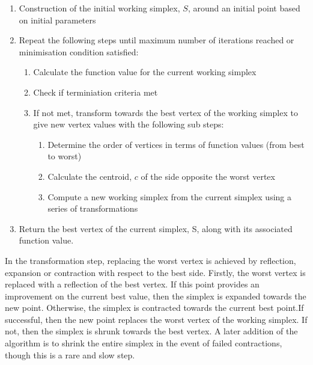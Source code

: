 \begin{framed}
\begin{enumerate}
\item Construction of the initial working simplex, $S$, around an initial
  point based on initial parameters
\item Repeat the following steps until maximum number of iterations
  reached or minimisation condition satisfied:
  \begin{enumerate}
  \item Calculate the function value for the current working simplex
  \item Check if terminiation criteria met
  \item If not met, transform towards the best vertex of the working simplex to give new
    vertex values with the following sub steps:
    \begin{enumerate}
      \item Determine the order of vertices in terms of function
        values (from best to worst)
        \item Calculate the centroid, $c$ of the side opposite the
          worst vertex
\item Compute a new working simplex from the current simplex using a
  series of transformations
\end{enumerate}
  \end{enumerate}
\item Return the best vertex of the current simplex, S, along with
  its associated function value.
\end{enumerate}

In the transformation step, replacing the worst vertex is achieved by reflection, expansion or contraction with respect to the best
side. Firstly, the worst vertex is replaced with a reflection of the
best vertex. If this point provides an improvement on the current best
value, then the simplex is expanded towards the new point. Otherwise,
the simplex is contracted towards the current best point.If
successful, then the new point replaces the worst vertex of the
working simplex. If not, then the simplex is shrunk towards the best
vertex. A later addition of the algorithm is to shrink the entire
simplex in the event of failed contractions, though this is a rare and
slow step.


\end{framed}
